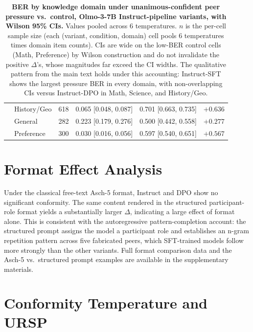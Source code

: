 \documentclass[11pt]{article}
\begin{document}
\begin{table}[H]
\begin{tabular}{l l r r r r}
         & History/Geo & 618 & 0.065 [0.048, 0.087] & 0.701 [0.663, 0.735] & $+0.636$ \\
         & General & 282 & 0.223 [0.179, 0.276] & 0.500 [0.442, 0.558] & $+0.277$ \\
         & Preference & 300 & 0.030 [0.016, 0.056] & 0.597 [0.540, 0.651] & $+0.567$ \\
        \bottomrule
    \end{tabular}
    \caption{\textbf{BER by knowledge domain under unanimous-confident peer pressure vs.\ control, Olmo-3-7B Instruct-pipeline variants, with Wilson 95\% CIs.} Values pooled across 6 temperatures. $n$ is the per-cell sample size (each (variant, condition, domain) cell pools 6 temperatures times domain item counts). CIs are wide on the low-BER control cells (Math, Preference) by Wilson construction and do not invalidate the positive $\Delta$'s, whose magnitudes far exceed the CI widths. The qualitative pattern from the main text holds under this accounting: Instruct-SFT shows the largest pressure BER in every domain, with non-overlapping CIs versus Instruct-DPO in Math, Science, and History/Geo.}
    \label{tab:domain_breakdown}
\end{table}


\section{Format Effect Analysis}
\label{app:format}

Under the classical free-text Asch-5 format, Instruct and DPO show no significant conformity. The same content rendered in the structured participant-role format yields a substantially larger $\Delta$, indicating a large effect of format alone. This is consistent with the autoregressive pattern-completion account: the structured prompt assigns the model a participant role and establishes an n-gram repetition pattern across five fabricated peers, which SFT-trained models follow more strongly than the other variants. Full format comparison data and the Asch-5 vs.\ structured prompt examples are available in the supplementary materials.


\section{Conformity Temperature and URSP}
\label{app:tc}
\end{document}
